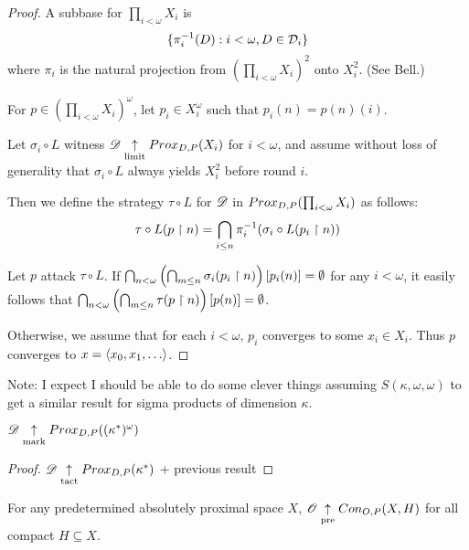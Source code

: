 \begin{proof}
  A subbase for $\prod_{i<\omega}X_i$ is
    \[
      \{\pi_i^{-1}(D):i<\omega, D\in\mathcal{D}_i\}
    \]
  where $\pi_i$ is the natural projection from 
  $\left(\prod_{i<\omega}X_i\right)^2$ onto $X_i^2$. (See Bell.)

  For $p\in \left(\prod_{i<\omega}X_i\right)^\omega$, let $p_i\in X_i^\omega$
  such that $p_i(n)=p(n)(i)$.

  Let $\sigma_i\circ L$ witness $\mathscr{D}\underset{\text{limit}}{\uparrow} Prox_{D,P}(X_i)$ for
  $i<\omega$, and assume without loss of generality that 
  $\sigma_i\circ L$ always yields $X_i^2$ before round $i$.

  Then we define the strategy $\tau\circ L$ for $\mathscr{D}$ in
  $Prox_{D,P}(\prod_{i<\omega}X_i)$ as follows:
    \[
      \tau\circ L(p\restriction n)
        =
      \bigcap_{i\leq n} \pi_i^{-1}(\sigma_i\circ L(p_i\restriction n))
    \]

  Let $p$ attack $\tau\circ L$. If
    $
      \bigcap_{n<\omega}
      \left(\bigcap_{m\leq n}\sigma_i(p_i\restriction n)\right)[p_i(n)]
      = \emptyset
    $
  for any $i<\omega$, it easily follows that 
    $
      \bigcap_{n<\omega}
      \left(\bigcap_{m\leq n}\tau(p\restriction n)\right)[p(n)]
      = \emptyset
    $.

  Otherwise, we assume that for each $i<\omega$, $p_i$ converges to some
  $x_i\in X_i$. Thus $p$ converges to $x=\<x_0,x_1,\dots\>$.
\end{proof}

Note: I expect I should be able to do some clever things 
assuming $S(\kappa,\omega,\omega)$ to get a similar result for sigma
products of dimension $\kappa$.

\begin{example}
  $\mathscr{D} \underset{\text{mark}}{\uparrow} Prox_{D,P}((\kappa^*)^\omega)$
\end{example}

\begin{proof}
  $\mathscr{D} \underset{\text{tact}}{\uparrow} Prox_{D,P}(\kappa^*)$ + previous result
\end{proof}




\newpage

\begin{theorem}
  For any predetermined absolutely proximal space $X$, 
  $\mathscr{O}\underset{\text{pre}}{\uparrow} Con_{O,P}(X,H)$ for all compact $H\subseteq X$.
\end{theorem}

